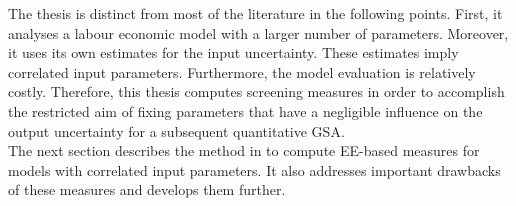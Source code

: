 \newline
The thesis is distinct from most of the literature in the following points. First, it analyses a labour economic model with a larger number of parameters. Moreover, it uses its own estimates for the input uncertainty. These estimates imply correlated input parameters. Furthermore, the model evaluation is relatively costly. Therefore, this thesis computes screening measures in order to accomplish the restricted aim of fixing parameters that have a negligible influence on the output uncertainty for a subsequent quantitative GSA.
\\
\newline
The next section describes the method in \cite{ge2014efficient} to compute EE-based measures for models with correlated input parameters. It also addresses important drawbacks of these measures and develops them further.